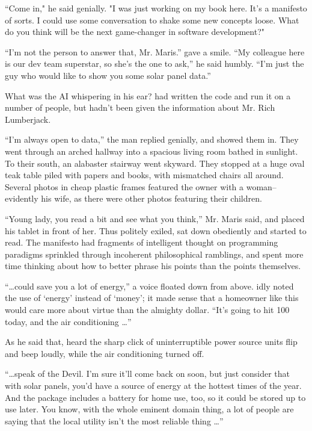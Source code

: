 ``Come in," he said genially. "I was just working on my book here. It's a manifesto of sorts. I could use some conversation to shake some new concepts loose. What do you think will be the next game-changer in software development?"

``I'm not the person to answer that, Mr. Maris.'' \energyJerk{} gave a smile. ``My colleague here is our dev team superstar, so she's the one to ask,'' he said humbly. ``I'm just the guy who would like to show you some solar panel data.''

What was the AI whispering in his ear? {\protag} had written the code and run it on a number of people, but hadn't been given the information about Mr. Rich Lumberjack.

``I'm always open to data,'' the man replied genially, and showed them in. They went through an arched hallway into a spacious living room bathed in sunlight. To their south, an alabaster stairway went skyward. They stopped at a huge oval teak table piled with papers and books, with mismatched chairs all around. Several photos in cheap plastic frames featured the owner with a woman--evidently his wife, as there were other photos featuring their children.

``Young lady, you read a bit and see what you think,'' Mr. Maris said, and placed his tablet in front of her. Thus politely exiled, {\protag} sat down obediently and started to read. The manifesto had fragments of intelligent thought on programming paradigms sprinkled through incoherent philosophical ramblings, and {\protag} spent more time thinking about how to better phrase his points than the points themselves.

``\dots could save you a lot of energy,'' a voice floated down from above. {\protag} idly noted the use of `energy' instead of `money'; it made sense that a homeowner like this would care more about virtue than the almighty dollar. ``It's going to hit 100 today, and the air conditioning \dots''

As he said that, {\protag} heard the sharp click of uninterruptible power source units flip and beep loudly, while the air conditioning turned off.

``\dots speak of the Devil. I'm sure it'll come back on soon, but just consider that with solar panels, you'd have a source of energy at the hottest times of the year. And the package includes a battery for home use, too, so it could be stored up to use later. You know, with the whole eminent domain thing, a lot of people are saying that the local utility isn't the most reliable thing \dots''

